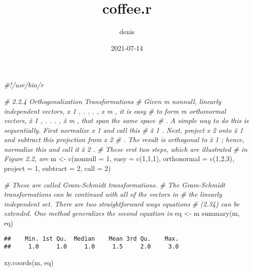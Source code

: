 \documentclass[
]{article}
\title{coffee.r}
\author{denis}
\date{2021-07-14}
\newenvironment{Shaded}{\begin{snugshade}}{\end{snugshade}}
\newcommand{\AttributeTok}[1]{\textcolor[rgb]{0.77,0.63,0.00}{#1}}
\newcommand{\CommentTok}[1]{\textcolor[rgb]{0.56,0.35,0.01}{\textit{#1}}}
\newcommand{\DecValTok}[1]{\textcolor[rgb]{0.00,0.00,0.81}{#1}}
\newcommand{\FunctionTok}[1]{\textcolor[rgb]{0.00,0.00,0.00}{#1}}
\newcommand{\NormalTok}[1]{#1}
\newcommand{\OtherTok}[1]{\textcolor[rgb]{0.56,0.35,0.01}{#1}}
\begin{document}
\maketitle

\begin{Shaded}
\begin{Highlighting}[]
\CommentTok{\#!/usr/bin/r}

\CommentTok{\# 2.2.4 Orthogonalization Transformations}
\CommentTok{\# Given m nonnull, linearly independent vectors, x 1 , . . . , x m , it is easy }
\CommentTok{\# to form m orthonormal vectors, x̃ 1 , . . . , x̃ m , that span the same space}
\CommentTok{\# . A simple way to do this is sequentially. First normalize x 1 and call this }
\CommentTok{\# x̃ 1 . Next, project x 2 onto x̃ 1 and subtract this projection from x 2 }
\CommentTok{\# . The result is orthogonal to x̃ 1 ; hence, normalize this and call it x̃ 2 .}
\CommentTok{\# These erst two steps, which are illustrated}
\CommentTok{\# in Figure 2.2, are}
\NormalTok{m }\OtherTok{\textless{}{-}} \FunctionTok{c}\NormalTok{(}\AttributeTok{nonnull =} \DecValTok{1}\NormalTok{, }\AttributeTok{easy =} \FunctionTok{c}\NormalTok{(}\DecValTok{1}\NormalTok{,}\DecValTok{1}\NormalTok{,}\DecValTok{1}\NormalTok{), }\AttributeTok{orthonormal =} \FunctionTok{c}\NormalTok{(}\DecValTok{1}\NormalTok{,}\DecValTok{2}\NormalTok{,}\DecValTok{3}\NormalTok{), }
       \AttributeTok{project =} \DecValTok{1}\NormalTok{, }\AttributeTok{subtract =} \DecValTok{2}\NormalTok{, }\AttributeTok{call =} \DecValTok{2}\NormalTok{)}

\CommentTok{\# These are called Gram{-}Schmidt transformations.}
\CommentTok{\# The Gram{-}Schmidt transformations can be continued with all of the vectors in }
\CommentTok{\# the linearly independent set. There are two straightforward ways equations }
\CommentTok{\# (2.34) can be extended. One method generalizes the second equation in}
\NormalTok{eq }\OtherTok{\textless{}{-}}\NormalTok{ m}
\FunctionTok{summary}\NormalTok{(m, eq)}
\end{Highlighting}
\end{Shaded}

\begin{verbatim}
##    Min. 1st Qu.  Median    Mean 3rd Qu.    Max. 
##     1.0     1.0     1.0     1.5     2.0     3.0
\end{verbatim}

\begin{Shaded}
\begin{Highlighting}[]
\FunctionTok{xy.coords}\NormalTok{(m, eq)}
\end{Highlighting}
\end{Shaded}
\end{document}
